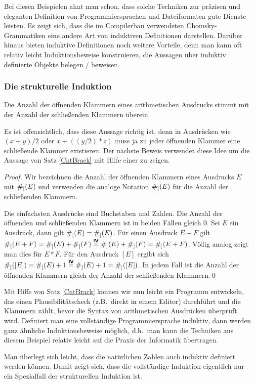 Bei diesen Beispielen ahnt man schon, dass solche Techniken zur
präzisen und eleganten Definition von Programmiersprachen und Dateiformaten gute
Dienste leisten. Es zeigt sich, dass die im Compilerbau verwendeten Chomsky-Grammatiken 
eine andere Art von induktiven Definitionen darstellen.  Darüber hinaus bieten induktive Definitionen  
noch weitere Vorteile, denn man kann oft relativ leicht Induktionsbeweise konstruieren, die  
Aussagen über induktiv definierte Objekte belegen / beweisen.

\subsubsection{Die strukturelle Induktion}

\begin{theorem}
\label{CntBrack}
Die Anzahl der öffnenden Klammern eines arithmetischen Ausdrucks stimmt
mit der Anzahl der schließenden Klammern überein.
\end{theorem}

Es ist offensichtlich, dass diese Aussage richtig ist, denn in
Ausdrücken wie $(x + y) / 2$ oder $x + ((y/2) * z)$ muss ja zu jeder
öffnenden Klammer eine schließende Klammer existieren. Der nächste
Beweis verwendet diese Idee um die Aussage von Satz \ref{CntBrack}
mit Hilfe einer 
zu zeigen.

\begin{proof}
Wir bezeichnen die Anzahl der öffnenden Klammern eines Ausdrucks $E$
mit $\#_[(E)$ und verwenden die analoge Notation $\#_](E)$ für die
Anzahl der schließenden Klammern.

\induproof%
{
Die einfachsten Ausdrücke sind Buchstaben und Zahlen. Die Anzahl der
öffnenden und schließenden Klammern ist in beiden Fällen gleich $0$.
}
{
Sei $E$ ein Ausdruck, dann gilt $\#_[(E) = \#_](E)$.
}
{
 Für einen Ausdruck $E + F$ gilt $\#_[(E + F) = \#_[(E
) +
 \#_[(F) \stackrel{\text{\textbf{\textsf{IV}}}}{=} \#_](E) +
 \#_](F) = \#_](E + F)$. Völlig analog zeigt man dies für $E *
 F$. Für den Ausdruck $[E]$ ergibt sich $\#_[([E]) = \#_[(E) + 1
 \stackrel{\text{\textbf{\textsf{IV}}}}{=} \#_](E) + 1 = \#_]([E])$.
 In jedem Fall ist die Anzahl der öffnenden Klammern gleich der Anzahl
 der schließenden Klammern.\qed
}
\end{proof}

\bigskip

Mit Hilfe von Satz \ref{CntBrack} können wir nun leicht ein Programm
entwickeln, das einen Plausibilitätscheck (z.B.~direkt in einem Editor)
durchführt und die Klammern zählt, bevor die Syntax von arithmetischen
Ausdrücken überprüft wird. Definiert man eine vollständige
Programmiersprache induktiv, dann werden ganz ähnliche
Induktionsbeweise möglich, d.h.~man kann die Techniken aus diesem
Beispiel relativ leicht auf die Praxis der Informatik übertragen.

Man überlegt sich leicht, dass die natürlichen Zahlen auch induktiv
definiert werden können. Damit zeigt sich, dass die vollständige
Induktion eigentlich nur ein Spezialfall der strukturellen Induktion
ist.
